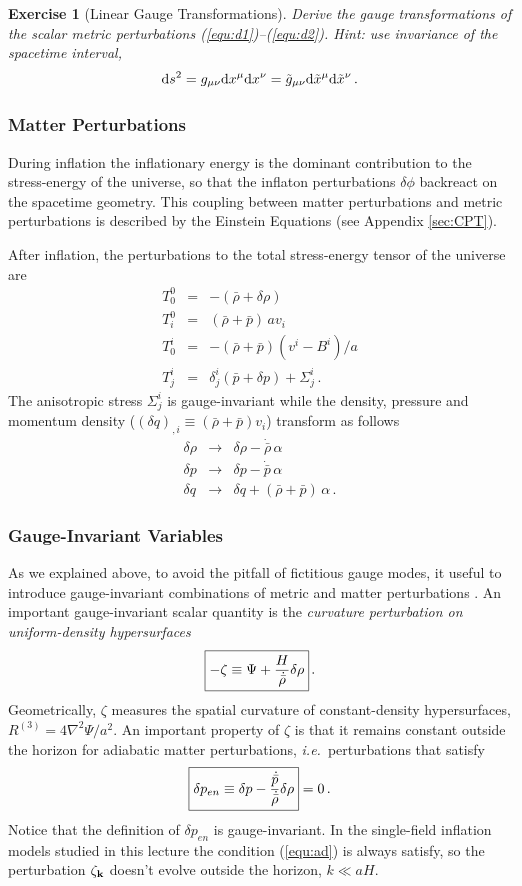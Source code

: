 \documentclass[12pt,letterpaper,rotate]{article}
\def\beq{\begin{equation}}
\def\eeq{\end{equation}}
\def\bea{\begin{eqnarray}}
\def\eea{\end{eqnarray}}
\def\d{{\rm d}}
\newtheorem{thm}{Exercise}
\begin{document}
{\begin{thm}[Linear Gauge Transformations]
Derive the gauge transformations of the scalar metric perturbations (\ref{equ:d1})--(\ref{equ:d2}). Hint: use invariance of the spacetime interval, 
\beq
\d s^2 = g_{\mu \nu} \d x^\mu \d x^\nu = \tilde g_{\mu \nu} \d \tilde x^\mu \d \tilde x^\nu\, .
\eeq
\label{ex:gauge}
\end{thm}

\subsubsection{Matter Perturbations}
During inflation the inflationary energy is the dominant contribution to the stress-energy of the universe, so that the inflaton perturbations $\delta \phi$ backreact on the spacetime geometry.
This coupling between matter perturbations and metric perturbations is described by the Einstein Equations (see Appendix \ref{sec:CPT}).

After inflation, the perturbations to the total stress-energy tensor of the universe are
\bea
T^0_0 &=& - (\bar \rho + \delta \rho) \\
T^0_i &=& (\bar \rho +\bar p)\, av_i \\
T^i_0 &=& -(\bar \rho + \bar p) (v^i - B^i)/a \\
T^i_j &=& \delta^i_j (\bar p + \delta p) + \Sigma^i_j\, .
\eea
The anisotropic stress $\Sigma^i_j$ is gauge-invariant while the density, pressure and momentum density ($(\delta q)_{,i} \equiv (\bar \rho + \bar p) v_i$) transform as follows
\bea
\delta \rho &\to& \delta \rho - \dot {\bar \rho} \,\alpha \\
\delta p &\to& \delta p - \dot {\bar p}\, \alpha \\
\delta q &\to& \delta q + (\bar \rho + \bar p)\, \alpha\, .
\eea



\subsubsection{Gauge-Invariant Variables}

As we explained above, to avoid the pitfall of fictitious gauge modes, it useful to introduce gauge-invariant combinations of metric and matter perturbations \cite{Bardeen:1980kt}.
An important gauge-invariant scalar quantity is the {\it curvature perturbation on
uniform-density hypersurfaces} \cite{BST}
\beq
\fbox{$\displaystyle
\label{equ:zeta} - \zeta \equiv  \Psi +  \frac{H}{\dot{\bar \rho}}
\delta \rho $} \, .
\eeq
Geometrically, $\zeta$ measures the spatial curvature of constant-density hypersurfaces, $R^{(3)} = 
4 \nabla^2 \Psi/a^2$. An important property of $\zeta$ is that it remains constant outside the
horizon for adiabatic matter perturbations, {\it i.e.}~perturbations that satisfy
\beq
\label{equ:ad}
\fbox{$\displaystyle
\delta p_{en} \equiv \delta p - \frac{\dot {\bar p}}{\dot {\bar \rho}} \delta \rho $} = 0\, .
\eeq
Notice that the definition of $\delta p_{en}$ is gauge-invariant.
In the single-field inflation models studied in this lecture the condition (\ref{equ:ad}) is always satisfy, so the perturbation $\zeta_{\bf k}$ doesn't evolve outside the horizon, $k \ll aH$.


}
\end{document}
